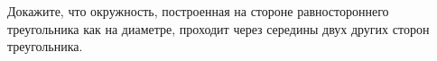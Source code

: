 \begin{ex}
	\begin{condition}
		 Докажите, что окружность, построенная на стороне равностороннего треугольника как на диаметре, проходит через середины двух других сторон треугольника.
	\end{condition}
\end{ex}